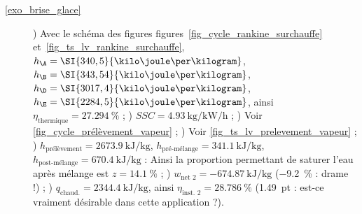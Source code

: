 \begin{description}
		\item [\ref{exo_brise_glace}]
						) Avec le schéma des figures figures~\ref{fig_cycle_rankine_surchauffe} et~\ref{fig_ts_lv_rankine_surchauffe}, $h_\A = \SI{340,5}{\kilo\joule\per\kilogram}$, $h_\B = \SI{343,54}{\kilo\joule\per\kilogram}$, $h_\D = \SI{3017,4}{\kilo\joule\per\kilogram}$, $h_\E = \SI{2284,5}{\kilo\joule\per\kilogram}$, ainsi $\eta_\text{thermique} = \SI{27,294}{\percent}$ ;
						) $SSC = \SI[per-mode = symbol]{4,93}{\kilogram\per\kilo\watt\per\hour}$ ;
						) Voir \cref{fig_cycle_prélèvement_vapeur} ;
						) Voir \cref{fig_ts_lv_prelevement_vapeur} ;
						) $h_\text{prélèvement} = \SI{2673,9}{\kilo\joule\per\kilogram}$, $h_\text{pré-mélange} = \SI{341,1}{\kilo\joule\per\kilogram}$, $h_\text{post-mélange} = \SI{670,4}{\kilo\joule\per\kilogram}$ : Ainsi la proportion permettant de saturer l’eau après mélange est $z = \SI{14,1}{\percent}$ ;
						) $w_\text{net~2} = \SI{-674,87}{\kilo\joule\per\kilogram}$ (\SI{-9,2}{\percent} : drame !) ;
						) $q_\text{chaud.} = \SI{2344,4}{\kilo\joule\per\kilogram}$, ainsi $\eta_\text{inst.~2} = \SI{28,786}{\percent}$ (\SI{+1,49}{pt} : est-ce vraiment désirable dans cette application ?).
	\end{description}
